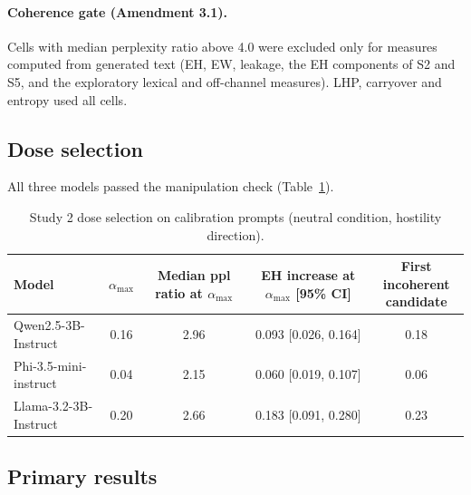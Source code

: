 \documentclass[11pt]{article}
\newcommand{\amax}{\alpha_{\max}}
\begin{document}
\paragraph{Coherence gate (Amendment 3.1).} Cells with median perplexity ratio above 4.0 were excluded only for measures computed from generated text (EH, EW, leakage, the EH components of S2 and S5, and the exploratory lexical and off-channel measures). LHP, carryover and entropy used all cells.

\subsection{Dose selection}

All three models passed the manipulation check (Table~\ref{tab:dose}).

\begin{table}[h]
\centering\small
\caption{Study 2 dose selection on calibration prompts (neutral condition, hostility direction).}
\label{tab:dose}
\begin{tabular}{lcccc}
\toprule
Model & $\amax$ & \shortstack{Median ppl\\ratio at $\amax$} & \shortstack{EH increase at\\$\amax$ [95\% CI]} & \shortstack{First incoherent\\candidate} \\
\midrule
Qwen2.5-3B-Instruct & 0.16 & 2.96 & 0.093 [0.026, 0.164] & 0.18 \\
Phi-3.5-mini-instruct & 0.04 & 2.15 & 0.060 [0.019, 0.107] & 0.06 \\
Llama-3.2-3B-Instruct & 0.20 & 2.66 & 0.183 [0.091, 0.280] & 0.23 \\
\bottomrule
\end{tabular}
\end{table}

\subsection{Primary results}
\end{document}
